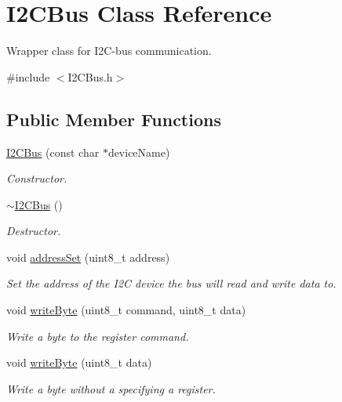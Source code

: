 \hypertarget{class_i2_c_bus}{\section{\-I2\-C\-Bus \-Class \-Reference}
\label{class_i2_c_bus}
}


\-Wrapper class for \-I2\-C-\/bus communication.  




{\ttfamily \#include $<$\-I2\-C\-Bus.\-h$>$}

\subsection*{\-Public \-Member \-Functions}
\begin{DoxyCompactItemize}
\item 
\hyperlink{class_i2_c_bus_afc250c51eed417b2726c53353cae4083}{\-I2\-C\-Bus} (const char $\ast$device\-Name)
\begin{DoxyCompactList}\small\item\em \-Constructor. \end{DoxyCompactList}\item 
\hyperlink{class_i2_c_bus_a70dac2923cd16ce06f0e73f7fc5bca89}{$\sim$\-I2\-C\-Bus} ()
\begin{DoxyCompactList}\small\item\em \-Destructor. \end{DoxyCompactList}\item 
void \hyperlink{class_i2_c_bus_a3df26769808e1e948dda57cd02680c3d}{address\-Set} (uint8\-\_\-t address)
\begin{DoxyCompactList}\small\item\em \-Set the address of the \-I2\-C device the bus will read and write data to. \end{DoxyCompactList}\item 
void \hyperlink{class_i2_c_bus_a0f9c9c32bff6152119b4ee79f003a1bd}{write\-Byte} (uint8\-\_\-t command, uint8\-\_\-t data)
\begin{DoxyCompactList}\small\item\em \-Write a byte to the register command. \end{DoxyCompactList}\item 
void \hyperlink{class_i2_c_bus_a1e64669ddb6db1efda2525d51e6a99e8}{write\-Byte} (uint8\-\_\-t data)
\begin{DoxyCompactList}\small\item\em \-Write a byte without a specifying a register. \end{DoxyCompactList}\item 

\end{DoxyCompactItemize}

